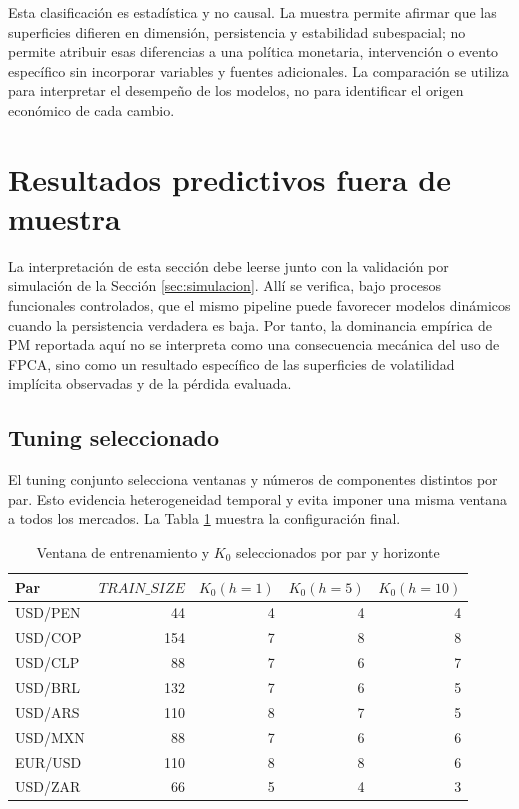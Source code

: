 \documentclass[a4paper,11pt]{article}
\newcommand{\SVIs}{superficies de volatilidad implícita}
\begin{document}
Esta clasificación es estadística y no causal. La muestra permite afirmar que las superficies difieren en dimensión, persistencia y estabilidad subespacial; no permite atribuir esas diferencias a una política monetaria, intervención o evento específico sin incorporar variables y fuentes adicionales. La comparación se utiliza para interpretar el desempeño de los modelos, no para identificar el origen económico de cada cambio.

\section{Resultados predictivos fuera de muestra}

La interpretación de esta sección debe leerse junto con la validación por simulación de la Sección \ref{sec:simulacion}. Allí se verifica, bajo procesos funcionales controlados, que el mismo pipeline puede favorecer modelos dinámicos cuando la persistencia verdadera es baja. Por tanto, la dominancia empírica de PM reportada aquí no se interpreta como una consecuencia mecánica del uso de FPCA, sino como un resultado específico de las \SVIs{} observadas y de la pérdida evaluada.

\subsection{Tuning seleccionado}

El tuning conjunto selecciona ventanas y números de componentes distintos por par. Esto evidencia heterogeneidad temporal y evita imponer una misma ventana a todos los mercados. La Tabla \ref{tab:tuning} muestra la configuración final.

\begin{table}[H]
\centering
\caption{Ventana de entrenamiento y \(K_0\) seleccionados por par y horizonte}
\label{tab:tuning}
\small
\begin{tabular}{lrrrr}
\toprule
Par & \(TRAIN\_SIZE\) & \(K_0(h=1)\) & \(K_0(h=5)\) & \(K_0(h=10)\) \\
\midrule
USD/PEN & 44 & 4 & 4 & 4 \\
USD/COP & 154 & 7 & 8 & 8 \\
USD/CLP & 88 & 7 & 6 & 7 \\
USD/BRL & 132 & 7 & 6 & 5 \\
USD/ARS & 110 & 8 & 7 & 5 \\
USD/MXN & 88 & 7 & 6 & 6 \\
EUR/USD & 110 & 8 & 8 & 6 \\
USD/ZAR & 66 & 5 & 4 & 3 \\
\bottomrule
\end{tabular}
\end{table}
\end{document}
